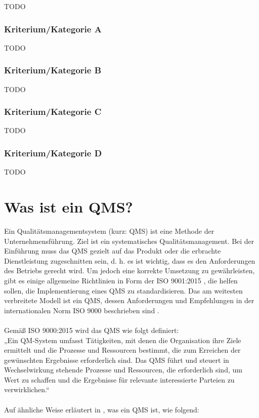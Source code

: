 \documentclass[11pt]{scrartcl}       %
\begin{document}
TODO

 

\subsubsection{Kriterium/Kategorie A}

TODO


\subsubsection{Kriterium/Kategorie B}

TODO


\subsubsection{Kriterium/Kategorie C}

TODO


\subsubsection{Kriterium/Kategorie D}

TODO

\newpage
\section{Was ist ein QMS?}

Ein Qualitätsmanagementsystem (kurz: QMS) ist eine Methode der Unternehmensführung. Ziel ist ein systematisches Qualitätsmanagement. Bei der Einführung muss das QMS gezielt auf das Produkt oder die erbrachte Dienstleistung zugeschnitten sein, d. h. es ist wichtig, dass es den Anforderungen des Betriebs gerecht wird. Um jedoch eine korrekte Umsetzung zu gewährleisten, gibt es einige allgemeine Richtlinien in Form der ISO 9001:2015 \cite{normungsinstitut2009qualitatsmanagementsysteme}, die helfen sollen, die Implementierung eines QMS zu standardisieren. Das am weitesten verbreitete Modell ist ein QMS, dessen Anforderungen
und Empfehlungen in der internationalen Norm ISO 9000 beschrieben sind \cite{sytko2017instrumentation}. 
\\
\\
Gemäß ISO 9000:2015 \cite{din20059000} wird das QMS wie folgt definiert:\\

    „Ein QM-System umfasst Tätigkeiten, mit denen die Organisation ihre Ziele ermittelt und die Prozesse und Ressourcen bestimmt, die zum Erreichen der gewünschten Ergebnisse erforderlich sind. Das QMS führt und steuert in Wechselwirkung stehende Prozesse und Ressourcen, die erforderlich sind, um Wert zu schaffen und die Ergebnisse für relevante interessierte Parteien zu verwirklichen.“ 
\\
\\
Auf ähnliche Weise erläutert \citeauthor{mai2020grundlage} in \citeyear{mai2020grundlage}, was ein QMS ist, wie folgend:\\
\end{document}
